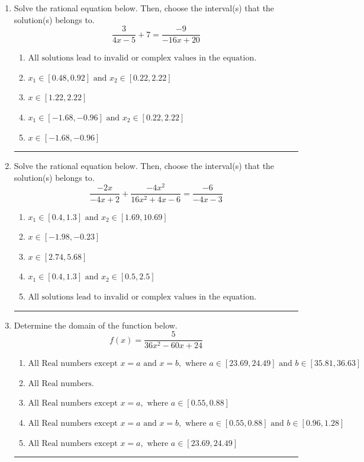 \documentclass[14pt]{extbook}
\newcommand{\litem}[1]{\item#1\hspace*{-1cm}\rule{\textwidth}{0.4pt}}
\begin{document}
\begin{enumerate}
{\begin{enumerate}[label=\Alph*.]
\end{enumerate} }
\litem{
Solve the rational equation below. Then, choose the interval(s) that the solution(s) belongs to.\[ \frac{3}{4x -5} + 7 = \frac{-9}{-16x + 20} \]\begin{enumerate}[label=\Alph*.]
\item \( \text{All solutions lead to invalid or complex values in the equation.} \)
\item \( x_1 \in [0.48, 0.92] \text{ and } x_2 \in [0.22,2.22] \)
\item \( x \in [1.22,2.22] \)
\item \( x_1 \in [-1.68, -0.96] \text{ and } x_2 \in [0.22,2.22] \)
\item \( x \in [-1.68,-0.96] \)

\end{enumerate} }
\litem{
Solve the rational equation below. Then, choose the interval(s) that the solution(s) belongs to.\[ \frac{-2x}{-4x + 2} + \frac{-4x^{2}}{16x^{2} +4 x -6} = \frac{-6}{-4x -3} \]\begin{enumerate}[label=\Alph*.]
\item \( x_1 \in [0.4, 1.3] \text{ and } x_2 \in [1.69,10.69] \)
\item \( x \in [-1.98,-0.23] \)
\item \( x \in [2.74,5.68] \)
\item \( x_1 \in [0.4, 1.3] \text{ and } x_2 \in [0.5,2.5] \)
\item \( \text{All solutions lead to invalid or complex values in the equation.} \)

\end{enumerate} }
\litem{
Determine the domain of the function below.\[ f(x) = \frac{5}{36x^{2} -60 x + 24} \]\begin{enumerate}[label=\Alph*.]
\item \( \text{All Real numbers except } x = a \text{ and } x = b, \text{ where } a \in [23.69, 24.49] \text{ and } b \in [35.81, 36.63] \)
\item \( \text{All Real numbers.} \)
\item \( \text{All Real numbers except } x = a, \text{ where } a \in [0.55, 0.88] \)
\item \( \text{All Real numbers except } x = a \text{ and } x = b, \text{ where } a \in [0.55, 0.88] \text{ and } b \in [0.96, 1.28] \)
\item \( \text{All Real numbers except } x = a, \text{ where } a \in [23.69, 24.49] \)

\end{enumerate} }
\end{enumerate}
\end{document}
